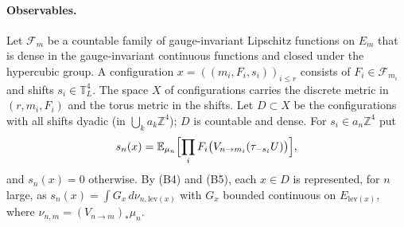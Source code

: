 \documentclass[11pt,a4paper]{article}
\theoremstyle{definition}
\theoremstyle{remark}
\newcommand{\E}{\mathbb{E}}
\newcommand{\T}{\mathbb{T}}
\begin{document}
\paragraph{Observables.} Let $\mathcal F_m$ be a countable family of gauge-invariant Lipschitz functions on $E_m$ that is dense in the gauge-invariant continuous functions and closed under the hypercubic group. A configuration $x=((m_i,F_i,s_i))_{i\le r}$ consists of $F_i\in\mathcal F_{m_i}$ and shifts $s_i\in\T^4_L$. The space $X$ of configurations carries the discrete metric in $(r,m_i,F_i)$ and the torus metric in the shifts. Let $D\subset X$ be the configurations with all shifts dyadic (in $\bigcup_ka_k\mathbb Z^4$); $D$ is countable and dense. For $s_i\in a_n\mathbb Z^4$ put
\[
s_n(x)=\E_{\mu_n}\Bigl[\prod_iF_i\bigl(V_{n\to m_i}(\tau_{-s_i}U)\bigr)\Bigr],
\]
and $s_n(x)=0$ otherwise. By (B4) and (B5), each $x\in D$ is represented, for $n$ large, as $s_n(x)=\int G_x\,d\nu_{n,\mathrm{lev}(x)}$ with $G_x$ bounded continuous on $E_{\mathrm{lev}(x)}$, where $\nu_{n,m}=(V_{n\to m})_*\mu_n$.
\end{document}

